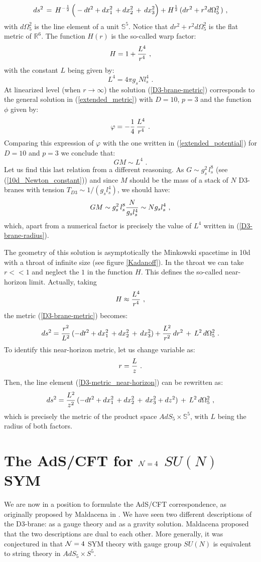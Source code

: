 \documentclass[12pt,notitlepage]{article}
\newcommand{\beq}{\begin{equation}}
\newcommand{\eeq}{\end{equation}}
\begin{document}
\beq
ds^2\,=\,H^{-{1\over 2}}\,
\Big(-dt^2+dx_1^2\,+dx_2^2\,+\, dx_{3}^2\Big)+
H^{{1\over 2}}\,(dr^2+r^2 d\Omega_5^2\,)\,\,,
\label{D3-brane-metric}
\eeq
with $d\Omega_5^2$ is the  line element of a unit ${\mathbb S}^5$. Notice that   $dr^2+r^2 d\Omega_5^2$ is the  flat metric of ${\mathbb R}^6$.  The function $H(r)$  is the so-called warp factor:
\beq
H=1+{L^4\over r^4}\,\,,
\eeq
with the constant $L$ being given by:
\beq
L^4= 4\pi g_s N l_s^4\,\,.
\label{D3-brane-radius}
\eeq
At linearized level (when $r\to\infty$) the solution (\ref{D3-brane-metric})
corresponds to the general solution in (\ref{extended_metric}) with $D=10$, $p=3$ and the function $\phi$ given by: 
\beq
\varphi=-{1\over 4}\,{L^4\over r^4}\,\,.
\eeq
Comparing this expression of $\varphi$ with the one written in (\ref{extended_potential}) for $D=10$ and  $p=3$ we conclude that:
\beq
GM\sim L^4\,\,.
\eeq
Let us find  this last relation from a different reasoning. 
As  $G\sim g_s^2\,l_s^8$ (see (\ref{10d_Newton_constant})) and  since $M$ should be the mass of a stack of $N$ D3-branes with tension $T_{D3}\sim 1/(g_s l_s^4)$, we should have:
\beq
GM\sim  g_s^2\,l_s^8 {N\over g_s l_s^4}\sim N g_s l_s^4\,\,,
\eeq
which, apart from a numerical factor is precisely the value of $L^4$ written in (\ref{D3-brane-radius}). 


The geometry of this solution is asymptotically the Minkowski spacetime in 10d with a throat of infinite size (see figure \ref{Kadanoff}). In the throat we can take $r<<1$ and neglect the $1$ in the function $H$. This defines the so-called near-horizon limit. Actually, taking
\beq
H\approx {L^4\over r^4}\,\,,
\eeq
the metric (\ref{D3-brane-metric})  becomes:
\beq
ds^2={r^2\over L^2}\,(-dt^2+dx_1^2\,+dx_2^2\,+\, dx_{3}^2)+{L^2\over r^2}\,dr^2\,+\,L^2\,
d\Omega_5^2\,\,.
\label{D3-metric_near-horizon}
\eeq
To identify this near-horizon metric, let us change variable as:
\beq
r={L\over z}\,\,.
\eeq
Then, the line element (\ref{D3-metric_near-horizon}) can be rewritten as:
\beq
ds^2={L^2\over z^2}\,(-dt^2+dx_1^2\,+dx_2^2\,+\, dx_{3}^2+dz^2)
\,+\,L^2\,
d\Omega_5^2\,\,,
\eeq
which  is precisely  the metric of the product space $AdS_5\times {\mathbb S}^5$,  with $L$ being the radius of both factors.


\section{The AdS/CFT for ${\cal N}=4$ $SU(N)$ SYM}

We are now in a position to formulate the AdS/CFT correspondence, as originally  proposed by Maldacena in  \cite{Maldacena:1997re}. We have seen two different descriptions of the D3-brane: as a gauge theory and as a gravity solution.  Maldacena proposed that the two descriptions are dual to each other. More generally, it was conjectured in \cite{Maldacena:1997re} that 
${\cal N}=4$  SYM theory with gauge group $SU(N)$  is equivalent to  string theory in  $AdS_5\times S^5$. 
\end{document}
